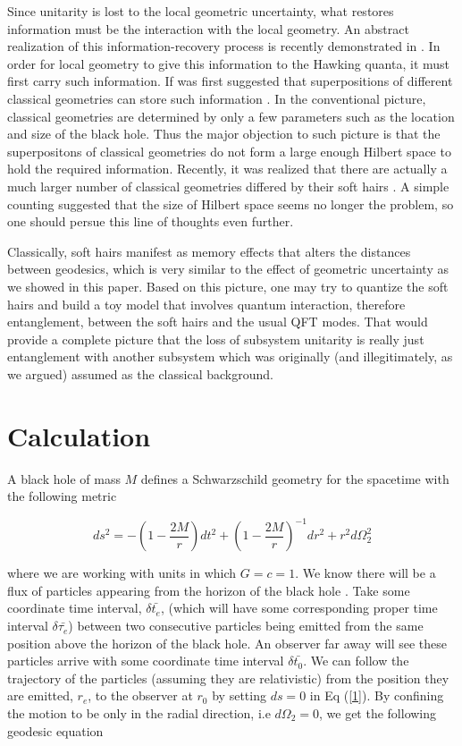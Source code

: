 \documentclass[aps,showpacs,twocolumn,floats,prd,superscriptaddress,nofootinbib]{revtex4-1}
\begin{document}
Since unitarity is lost to the local geometric uncertainty, what restores information must be the interaction with the local geometry. 
An abstract realization of this information-recovery process is recently demonstrated in \cite{OsuPag16}. 
In order for local geometry to give this information to the Hawking quanta, it must first carry such information.
If was first suggested that superpositions of different classical geometries can store such information \cite{NomVar12}.
In the conventional picture, classical geometries are determined by only a few parameters such as the location and size of the black hole.
Thus the major objection to such picture is that the superpositons of classical geometries do not form a large enough Hilbert space to hold the required information.
Recently, it was realized that there are actually a much larger number of classical geometries differed by their soft hairs \cite{HawPer16}.
A simple counting suggested that the size of Hilbert space seems no longer the problem, so one should persue this line of thoughts even further.

Classically, soft hairs manifest as memory effects that alters the distances between geodesics, which is very similar to the effect of geometric uncertainty as we showed in this paper.
Based on this picture, one may try to quantize the soft hairs and build a toy model that involves quantum interaction, therefore entanglement, between the soft hairs and the usual QFT modes.
That would provide a complete picture that the loss of subsystem unitarity is really just entanglement with another subsystem which was originally (and illegitimately, as we argued) assumed as the classical background.


\appendix


\section{Calculation}

A black hole of mass $M$ defines a Schwarzschild geometry for the spacetime with the following metric 

\begin{equation}
	ds^2 = - \left( 1 -\frac{2M}{r} \right) dt^2 + \left( 1 - \frac{2M}{r} \right)^{-1} dr^2 + r^2 d \Omega_2^2	\label{1}
\end{equation}

where we are working with units in which $G = c = 1$. We know there will be a flux of particles appearing from the horizon of the black hole \cite{Haw74}. Take some coordinate time interval, $\delta \bar{t_e}$, (which will have some corresponding proper time interval $\delta \bar{\tau_e}$) between two consecutive particles being emitted from the same position above the horizon of the black hole. An observer far away will see these particles arrive with some coordinate time interval $\delta \bar{t_0}$. We can follow the trajectory of the particles (assuming they are relativistic) from the position they are emitted, $r_e$, to the observer at $r_0$ by setting $ds = 0$ in Eq (\ref{1}). By confining the motion to be only in the radial direction, i.e $d \Omega_2 = 0$, we get the following geodesic equation
\end{document}
